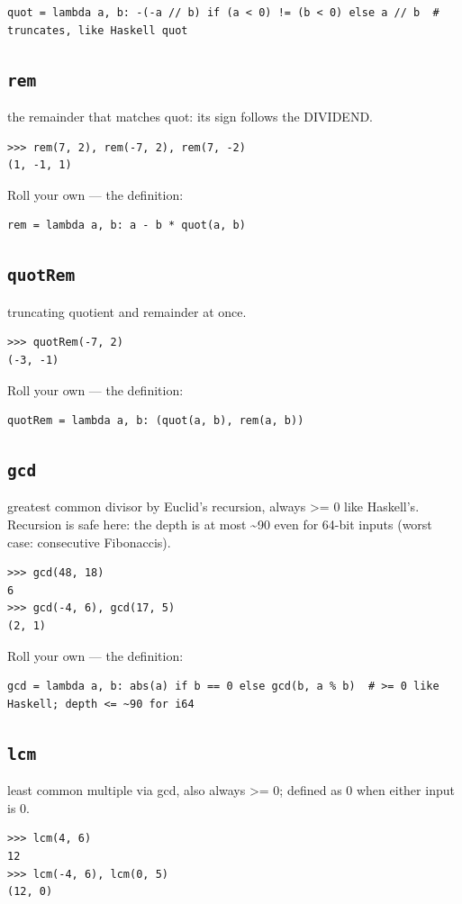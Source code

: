\documentclass[10pt,letterpaper]{book}
\begin{document}
\begin{lstlisting}[style=ex]
quot = lambda a, b: -(-a // b) if (a < 0) != (b < 0) else a // b  # truncates, like Haskell quot
\end{lstlisting}
\subsection{\texttt{rem}}\label{def:rem}
the remainder that matches quot: its sign follows the DIVIDEND.
\begin{lstlisting}[style=ex]
>>> rem(7, 2), rem(-7, 2), rem(7, -2)
(1, -1, 1)
\end{lstlisting}

Roll your own --- the definition:

\begin{lstlisting}[style=ex]
rem = lambda a, b: a - b * quot(a, b)
\end{lstlisting}
\subsection{\texttt{quotRem}}\label{def:quotRem}
truncating quotient and remainder at once.
\begin{lstlisting}[style=ex]
>>> quotRem(-7, 2)
(-3, -1)
\end{lstlisting}

Roll your own --- the definition:

\begin{lstlisting}[style=ex]
quotRem = lambda a, b: (quot(a, b), rem(a, b))
\end{lstlisting}
\subsection{\texttt{gcd}}\label{def:gcd}
greatest common divisor by Euclid's recursion, always >= 0 like Haskell's. Recursion is safe here: the depth is at most \~{}90 even for 64-bit inputs (worst case: consecutive Fibonaccis).
\begin{lstlisting}[style=ex]
>>> gcd(48, 18)
6
>>> gcd(-4, 6), gcd(17, 5)
(2, 1)
\end{lstlisting}

Roll your own --- the definition:

\begin{lstlisting}[style=ex]
gcd = lambda a, b: abs(a) if b == 0 else gcd(b, a % b)  # >= 0 like Haskell; depth <= ~90 for i64
\end{lstlisting}
\subsection{\texttt{lcm}}\label{def:lcm}
least common multiple via gcd, also always >= 0; defined as 0 when either input is 0.
\begin{lstlisting}[style=ex]
>>> lcm(4, 6)
12
>>> lcm(-4, 6), lcm(0, 5)
(12, 0)
\end{lstlisting}
\end{document}
